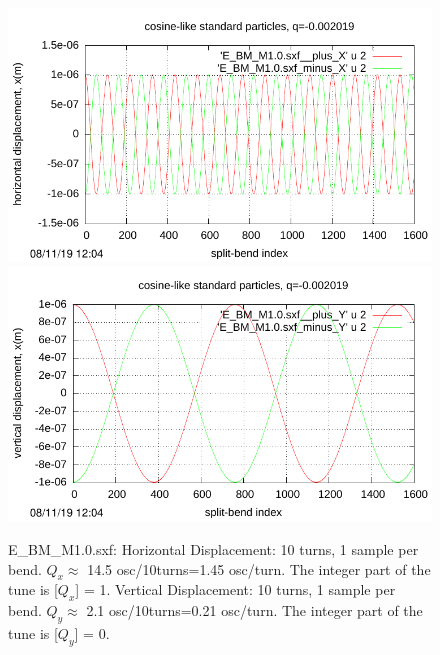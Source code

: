 \documentclass[12pt]{article}
\begin{document}
\begin{figure}[htbp] 
  \includegraphics[scale=1.0]{pdf/Fig_I-4t.pdf} 
  \includegraphics[scale=1.0]{pdf/Fig_I-4b.pdf} 
\caption{E\_BM\_M1.0.sxf: Horizontal Displacement: 10 turns, 1 sample per bend. 
$Q_x\approx$ 14.5 osc/10turns=1.45 osc/turn. 
The integer part of the tune is [$Q_x$] = 1. Vertical Displacement: 10 turns, 1 sample per bend. 
$Q_y\approx$ 2.1 osc/10turns=0.21 osc/turn. The integer part of the tune is [$Q_y$] = 0.}
\end{figure}


\clearpage
\end{document}
